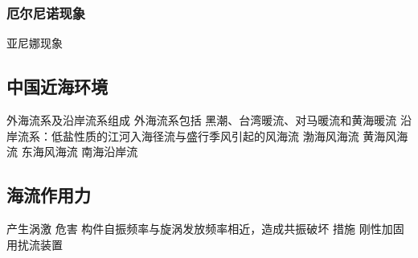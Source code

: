 	\subsubsection{厄尔尼诺现象}
		亚尼娜现象

\subsection{中国近海环境}
	外海流系及沿岸流系组成
	外海流系包括 黑潮、台湾暖流、对马暖流和黄海暖流
	沿岸流系：低盐性质的江河入海径流与盛行季风引起的风海流
				渤海风海流
				黄海风海流
				东海风海流
				南海沿岸流
	
	
\subsection {海流作用力}
	产生涡激
	危害 构件自振频率与旋涡发放频率相近，造成共振破坏
	措施 刚性加固 用扰流装置
	
